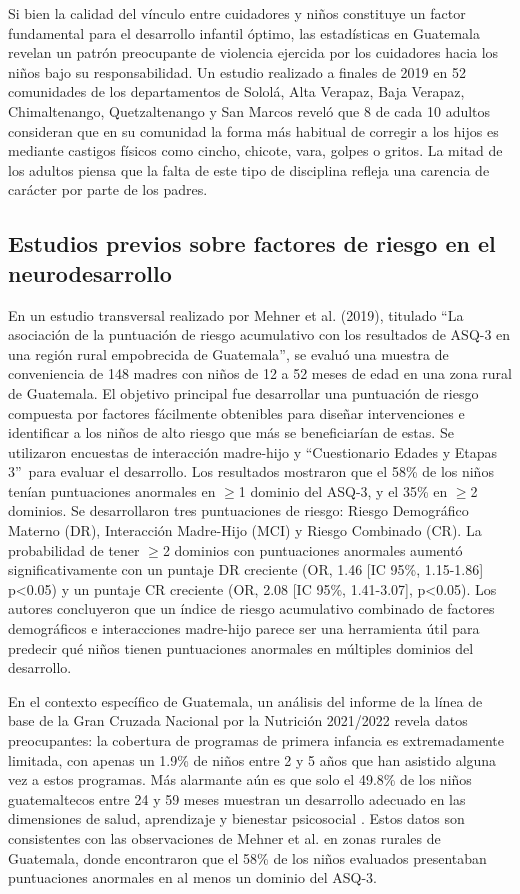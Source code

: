 \documentclass[11pt,letterpaper]{report}
\newcommand{\asq}{“Cuestionario Edades y Etapas 3”}
\begin{document}
Si bien la calidad del vínculo entre cuidadores y niños constituye un factor
fundamental para el desarrollo infantil óptimo, las estadísticas en Guatemala
revelan un patrón preocupante de violencia ejercida por los cuidadores hacia
los niños bajo su responsabilidad. Un estudio realizado a finales de 2019 en 52
comunidades de los departamentos de Sololá, Alta Verapaz, Baja Verapaz,
Chimaltenango, Quetzaltenango y San Marcos reveló que 8 de cada 10 adultos
consideran que en su comunidad la forma más habitual de corregir a los hijos es
mediante castigos físicos como cincho, chicote, vara, golpes o gritos. La mitad
de los adultos piensa que la falta de este tipo de disciplina refleja una
carencia de carácter por parte de los padres. \cite{PoliticaInfanciaGuate}
\cite{UNICEFComportamientosNinez}

\subsection{Estudios previos sobre factores de riesgo en el neurodesarrollo}
En un estudio transversal realizado por Mehner et al. (2019), titulado
``La asociación de la puntuación de riesgo acumulativo con los resultados de
ASQ-3 en una región rural empobrecida de Guatemala'', se evaluó una muestra de
conveniencia de 148 madres con niños de 12 a 52 meses de edad en una zona rural
de Guatemala. El objetivo principal fue desarrollar una puntuación de riesgo
compuesta por factores fácilmente obtenibles para diseñar intervenciones e
identificar a los niños de alto riesgo que más se beneficiarían de estas. Se
utilizaron encuestas de interacción madre-hijo y \asq\ para evaluar el
desarrollo. Los resultados mostraron que el 58\% de los niños tenían
puntuaciones anormales en $\ge$1 dominio del ASQ-3, y el 35\% en $\ge$2
dominios. Se desarrollaron tres puntuaciones de riesgo: Riesgo Demográfico
Materno (DR), Interacción Madre-Hijo (MCI) y Riesgo Combinado (CR). La
probabilidad de tener $\ge$2 dominios con puntuaciones anormales aumentó
significativamente con un puntaje DR creciente (OR, 1.46 [IC 95\%, 1.15-1.86]
p<0.05) y un puntaje CR creciente (OR, 2.08 [IC 95\%, 1.41-3.07], p<0.05). Los
autores concluyeron que un índice de riesgo acumulativo combinado de factores
demográficos e interacciones madre-hijo parece ser una herramienta útil para
predecir qué niños tienen puntuaciones anormales en múltiples dominios del
desarrollo. \cite{CMehner2019}

En el contexto específico de Guatemala, un análisis del informe de la  línea de
base de la Gran Cruzada Nacional por la Nutrición 2021/2022 revela  datos
preocupantes: la cobertura de programas de primera infancia es extremadamente
limitada, con apenas un 1.9\% de niños entre 2 y 5 años que han asistido alguna
vez a estos programas. Más alarmante aún es que solo el 49.8\% de los niños
guatemaltecos entre 24 y 59 meses muestran un desarrollo adecuado  en las
dimensiones de salud, aprendizaje y bienestar psicosocial \cite{SESAN2022}.
Estos datos son consistentes con las observaciones de Mehner et al.
\cite{CMehner2019} en zonas rurales de Guatemala, donde encontraron que el 58\%
de los niños evaluados presentaban puntuaciones anormales en al menos un
dominio del ASQ-3.
\end{document}
